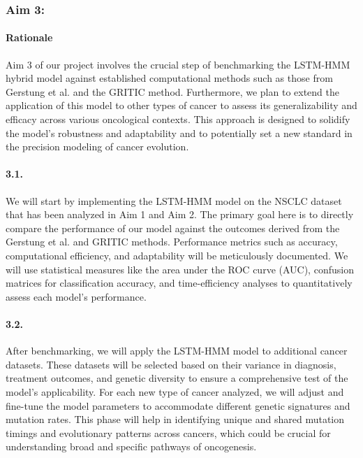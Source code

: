 \subsubsection{Aim 3: \SpecificAimThree}

\paragraph{Rationale}

Aim 3 of our project involves the crucial step of benchmarking the LSTM-HMM hybrid model against established computational methods such as those from Gerstung et al. and the GRITIC method. 
Furthermore, we plan to extend the application of this model to other types of cancer to assess its generalizability and efficacy across various oncological contexts. 
This approach is designed to solidify the model's robustness and adaptability and to potentially set a new standard in the precision modeling of cancer evolution.

\paragraph{3.1. \SpecificAimThreeA}

We will start by implementing the LSTM-HMM model on the NSCLC dataset that has been analyzed in Aim 1 and Aim 2. The primary goal here is to directly compare the performance of our model against the outcomes derived from the Gerstung et al. and GRITIC methods. Performance metrics such as accuracy, computational efficiency, and adaptability will be meticulously documented. We will use statistical measures like the area under the ROC curve (AUC), confusion matrices for classification accuracy, and time-efficiency analyses to quantitatively assess each model’s performance.

\paragraph{3.2. \SpecificAimThreeB}

After benchmarking, we will apply the LSTM-HMM model to additional cancer datasets. These datasets will be selected based on their variance in diagnosis, treatment outcomes, and genetic diversity to ensure a comprehensive test of the model’s applicability. For each new type of cancer analyzed, we will adjust and fine-tune the model parameters to accommodate different genetic signatures and mutation rates. This phase will help in identifying unique and shared mutation timings and evolutionary patterns across cancers, which could be crucial for understanding broad and specific pathways of oncogenesis.

